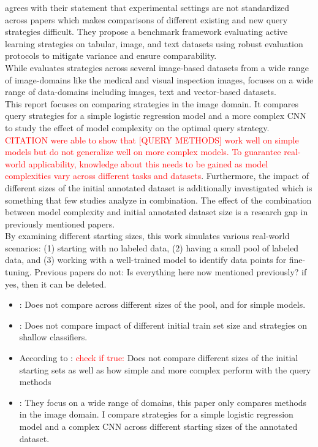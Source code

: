 \documentclass{article}
\theoremstyle{plain}
\theoremstyle{definition}
\theoremstyle{remark}
\begin{document}
\cite{werner_comparableactivelearning} agrees with their statement that experimental settings are not standardized across papers which makes comparisons of different existing and new query strategies difficult. They propose a benchmark framework evaluating active learning strategies on tabular, image, and text datasets using robust evaluation protocols to mitigate variance and ensure comparability. \\
While \cite{ueno_benchmarkingofquerystrategies} evaluates strategies across several image-based datasets from a wide range of image-domains like the medical and visual inspection images, \cite{werner_comparableactivelearning} focuses on a wide range of data-domains including images, text and vector-based datasets. \\
This report focuses on comparing strategies in the image domain. It compares query strategies for a simple logistic regression model and a more complex CNN to study the effect of model complexity on the optimal query strategy. \textcolor{red}{CITATION were able to show that [QUERY METHODS] work well on simple models but do not generalize well on more complex models. To guarantee real-world applicability, knowledge about this needs to be gained as model complexities vary across different tasks and datasets}. Furthermore, the impact of different sizes of the initial annotated dataset is additionally investigated which is something that few studies analyze in combination. The effect of the combination between model complexity and initial annotated dataset size is a research gap in previously mentioned papers. \\
By examining different starting sizes, this work simulates various real-world scenarios: (1) starting with no labeled data, (2) having a small pool of labeled data, and (3) working with a well-trained model to identify data points for fine-tuning.
Previous papers do not: Is everything here now mentioned previously? if yes, then it can be deleted.
\begin{itemize}
	\item \cite{schröder_revisitinguncertaintybasedquerystrategies}: Does not compare across different sizes of the pool, and for simple models.
	\item \cite{comparativesurveydeepactive}: Does not compare impact of different initial train set size and strategies on shallow classifiers.
	
	\item According to \cite{ueno_benchmarkingofquerystrategies}: \textcolor{red}{check if true:} Does not compare different sizes of the initial starting sets as well as how simple and more complex perform with the query methods
	
	\item \cite{werner_comparableactivelearning}: They focus on a wide range of domains, this paper only compares methods in the image domain. I compare strategies for a simple logistic regression model and a complex CNN across different starting sizes of the annotated dataset. \\
\end{itemize}
\end{document}
